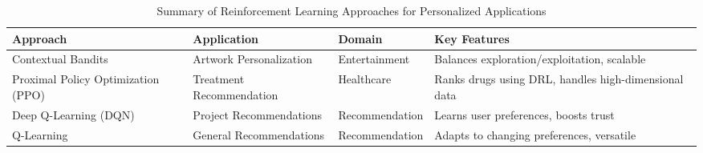 \begin{table}[htb]
\centering
\small
\begin{tabular}{|p{2.8cm}|p{3cm}|p{2.8cm}|p{4cm}|}
\hline
\textbf{Approach} & \textbf{Application} & \textbf{Domain} & \textbf{Key Features} \\
\hline
Contextual Bandits & Artwork Personalization & Entertainment & Balances exploration/exploitation, scalable \\
\hline
Proximal Policy Optimization (PPO) & Treatment Recommendation & Healthcare & Ranks drugs using DRL, handles high-dimensional data \\
\hline
Deep Q-Learning (DQN) & Project Recommendations & Recommendation & Learns user preferences, boosts trust \\
\hline
Q-Learning & General Recommendations & Recommendation & Adapts to changing preferences, versatile \\
\hline
\end{tabular}
\caption{Summary of Reinforcement Learning Approaches for Personalized Applications}
\label{tab:rl-approaches}
\end{table}
